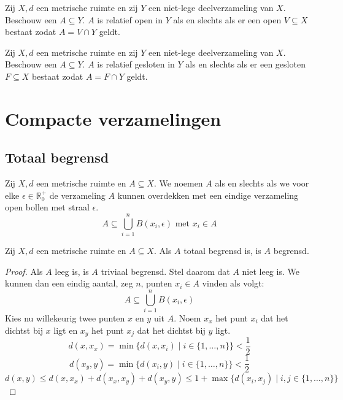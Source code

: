\documentclass[main.tex]{subfiles}
\begin{document}
\begin{pr}
  \label{pr:relatief-open-snijdigen}
  Zij $X,d$ een metrische ruimte en zij $Y$ een niet-lege deelverzameling van $X$.
  Beschouw een $A \subseteq Y$.
  $A$ is relatief open in $Y$ als en slechts als er een open $V \subseteq X$ bestaat zodat $A=V \cap Y$ geldt.
\end{pr}

\begin{pr}
  \label{pr:relatief-gesloten-snijdigen}
  Zij $X,d$ een metrische ruimte en zij $Y$ een niet-lege deelverzameling van $X$.
  Beschouw een $A \subseteq Y$.
  $A$ is relatief gesloten in $Y$ als en slechts als er een gesloten $F \subseteq X$ bestaat zodat $A=F \cap Y$ geldt.
\end{pr}


\section{Compacte verzamelingen}
\label{sec:comp-verz}

\subsection{Totaal begrensd}
\label{sec:totaal-begrensd}

\begin{de}
  Zij $X,d$ een metrische ruimte en $A \subseteq X$.
  We noemen $A$  als en slechts als we voor elke $\epsilon \in \mathbb{R}_{0}^{+}$ de verzameling $A$ kunnen overdekken met een eindige verzameling open bollen met straal $\epsilon$.
  \[ A \subseteq \bigcup_{i=1}^{n}B(x_{i},\epsilon) \text{ met } x_{i} \in A \]
\end{de}

\begin{bpr}
  Zij $X,d$ een metrische ruimte en $A \subseteq X$.
  Als $A$ totaal begrensd is, is $A$ begrensd.

  \begin{proof}
    Als $A$ leeg is, is $A$ triviaal begrensd.
    Stel daarom dat $A$ niet leeg is.
    We kunnen dan een eindig aantal, zeg $n$, punten $x_{i}\in A$ vinden als volgt:
    \[ A \subseteq \bigcup_{i=1}^{n}B(x_{i},\epsilon) \]
    Kies nu willekeurig twee punten $x$ en $y$ uit $A$.
    Noem $x_{x}$ het punt $x_{i}$ dat het dichtst bij $x$ ligt en $x_{y}$ het punt $x_{j}$ dat het dichtst bij $y$ ligt.
    \[ d(x,x_{x}) = \min\{ d(x,x_{i}) \mid i \in \{ 1,\dotsc,n \}\} < \frac{1}{2} \]
    \[ d(x_{y},y) = \min\{ d(x_{i},y) \mid i \in \{ 1,\dotsc,n \}\} < \frac{1}{2} \]
    \[ d(x,y) \le d(x,x_{x}) + d(x_{x},x_{y}) + d(x_{y},y) \le 1 + \max\{ d(x_{i},x_{j}) \mid i,j \in \{1,\dotsc,n\} \} \]
  \end{proof}
\end{bpr}
\end{document}

